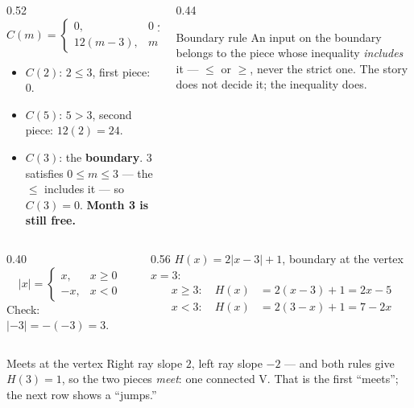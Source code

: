 \documentclass[aspectratio=169, 11pt]{beamer}
\begin{document}
\begin{frame}[t, plain]
  \begin{columns}[T]
    \begin{column}{0.52\textwidth}
      $C(m)=\begin{cases} 0, & 0\le m\le 3 \\ 12(m-3), & m>3 \end{cases}$
      \begin{itemize}\setlength{\itemsep}{4pt}
        \item $C(2)$: $2\le3$, first piece: $0$.
        \item $C(5)$: $5>3$, second piece: $12(2)=24$.
        \item $C(3)$: the \textbf{boundary}. $3$ satisfies $0\le m\le3$ --- the $\le$ includes
              it --- so $C(3)=0$. \textbf{Month 3 is still free.}
      \end{itemize}
    \end{column}
    \begin{column}{0.44\textwidth}
      \begin{block}{Boundary rule}
        An input on the boundary belongs to the piece whose inequality \emph{includes} it ---
        $\le$ or $\ge$, never the strict one. The story does not decide it; the inequality does.
      \end{block}
    \end{column}
  \end{columns}
\end{frame}

\begin{frame}[t, plain]
  \begin{columns}[T]
    \begin{column}{0.40\textwidth}
      \[ |x|=\begin{cases} x, & x\ge0 \\ -x, & x<0 \end{cases} \]
      Check: $|-3|=-(-3)=3$.
    \end{column}
    \begin{column}{0.56\textwidth}
      $H(x)=2|x-3|+1$, boundary at the vertex $x=3$:
      \begin{align*}
        x\ge3:\quad H(x) &= 2(x-3)+1 = 2x-5 \\
        x<3:\quad H(x) &= 2(3-x)+1 = 7-2x
      \end{align*}
    \end{column}
  \end{columns}
  \vspace{4pt}
  \begin{block}{Meets at the vertex}
    Right ray slope $2$, left ray slope $-2$ --- and both rules give $H(3)=1$, so the two pieces
    \emph{meet}: one connected V. That is the first ``meets''; the next row shows a ``jumps.''
  \end{block}
\end{frame}
\end{document}
